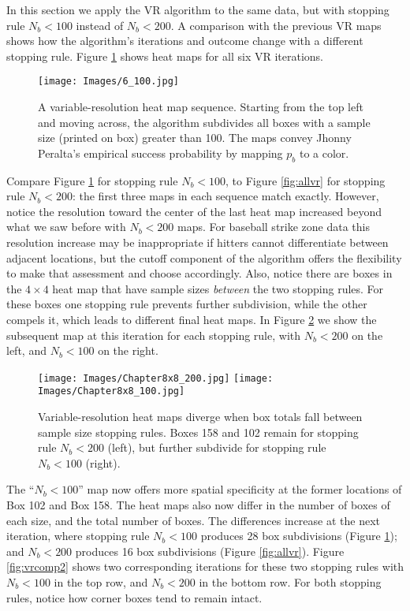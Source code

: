 In this section we apply the VR algorithm to the same data, but with stopping rule $N_{b} < 100$ instead of $N_{b} < 200$. A comparison with the previous VR maps shows how the algorithm's iterations and outcome change with a different stopping rule. Figure \ref{fig:altsr} shows heat maps for all six VR iterations.
        \begin{figure}[H]
      	\centering
      	\texttt{[image: Images/6\_100.jpg]}
      	\caption{A variable-resolution heat map sequence. Starting from the top left and moving across, the algorithm subdivides all boxes with a sample size (printed on box) greater than 100. The maps convey Jhonny Peralta's empirical success probability by mapping $p_{b}$ to a color.}
      	\label{fig:altsr}
\end{figure} 	
Compare Figure \ref{fig:altsr} for stopping rule $N_{b} < 100$, to Figure \ref{fig:allvr} for stopping rule $N_{b} < 200$: the first three maps in each sequence match exactly. However, notice the resolution toward the center of the last heat map increased beyond what we saw before with $N_{b} < 200$ maps. For baseball strike zone data this resolution increase may be inappropriate if hitters cannot differentiate between adjacent locations, but the cutoff component of the algorithm offers the flexibility to make that assessment and choose accordingly. Also, notice there are boxes in the $4 \times 4$ heat map that have sample sizes {\it between} the two stopping rules. For these boxes one stopping rule prevents further subdivision, while the other compels it, which leads to different final heat maps. In Figure \ref{fig:vrcomp} we show the subsequent map at this iteration for each stopping rule, with $N_{b} < 200$ on the left, and $N_{b} < 100$ on the right.
        \begin{figure}[H]
      	\centering      
      	\texttt{[image: Images/Chapter8x8\_200.jpg]}
      	\texttt{[image: Images/Chapter8x8\_100.jpg]}
      	\caption{Variable-resolution heat maps diverge when box totals fall between sample size stopping rules. Boxes 158 and 102 remain for stopping rule $N_{b} < 200$ (left), but further subdivide for stopping rule $N_{b} < 100$ (right).}
      	\label{fig:vrcomp}
\end{figure} 
The ``$N_{b} < 100$'' map now offers more spatial specificity at the former locations of Box 102 and Box 158. The heat maps also now differ in the number of boxes of each size, and the total number of boxes.  The differences increase at the next iteration, where stopping rule $N_{b} < 100$ produces 28 box subdivisions (Figure \ref{fig:altsr}); and $N_{b} < 200$ produces 16 box subdivisions (Figure \ref{fig:allvr}). Figure \ref{fig:vrcomp2} shows two corresponding iterations for these two stopping rules with $N_{b} < 100$ in the top row, and $N_{b} < 200$ in the bottom row. For both stopping rules, notice how corner boxes tend to remain intact.
